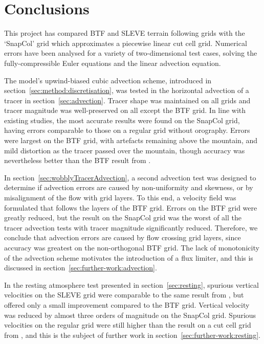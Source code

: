 \chapter{Conclusions}
\label{sec:conclusions}

This project has compared BTF and SLEVE terrain following grids with the `SnapCol' grid which approximates a piecewise linear cut cell grid.   Numerical errors have been analysed for a variety of two-dimensional test cases, solving the fully-compressible Euler equations and the linear advection equation.

The model's upwind-biased cubic advection scheme, introduced in section~\ref{sec:method:discretisation}, was tested in the horizontal advection of a tracer in section~\ref{sec:advection}.  Tracer shape was maintained on all grids and tracer magnitude was well-preserved on all except the BTF grid.  In line with existing studies, the most accurate results were found on the SnapCol grid, having errors comparable to those on a regular grid without orography.  Errors were largest on the BTF grid, with artefacts remaining above the mountain, and mild distortion as the tracer passed over the mountain, though accuracy was nevertheless better than the BTF result from \textcite{schaer2002}.

In section~\ref{sec:wobblyTracerAdvection}, a second advection test was designed to determine if advection errors are caused by non-uniformity and skewness, or by misalignment of the flow with grid layers.  To this end, a velocity field was formulated that follows the layers of the BTF grid.
Errors on the BTF grid were greatly reduced, but the result on the SnapCol grid was the worst of all the tracer advection tests with tracer magnitude significantly reduced.  Therefore, we conclude that advection errors are caused by flow crossing grid layers, since accuracy was greatest on the non-orthogonal BTF grid.  The lack of monotonicity of the advection scheme motivates the introduction of a flux limiter, and this is discussed in section~\ref{sec:further-work:advection}.

 In the resting atmosphere test presented in section~\ref{sec:resting}, spurious vertical velocities on the SLEVE grid were comparable to the same result from \textcite{schaer2002}, but offered only a small improvement compared to the BTF grid.  Vertical velocity was reduced by almost three orders of magnitude on the SnapCol grid.  Spurious velocities on the regular grid were still higher than the result on a cut cell grid from \textcite{good2013}, and this is the subject of further work in section~\ref{sec:further-work:resting}.

